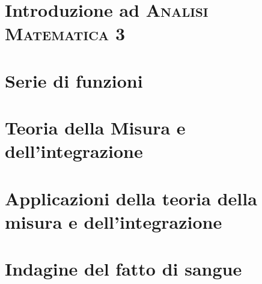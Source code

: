 \documentclass[a4paper, 11pt, twoside, openright, italian]{memoir}
\begin{document}
\frontmatter




\mainmatter

\part{Introduzione ad \textsc{Analisi Matematica 3}}

\part{Serie di funzioni}



\part{Teoria della Misura e dell'integrazione}


\part{Applicazioni della teoria della misura e dell'integrazione}



\appendix
\part{Indagine del fatto di sangue}





\backmatter

\end{document}
